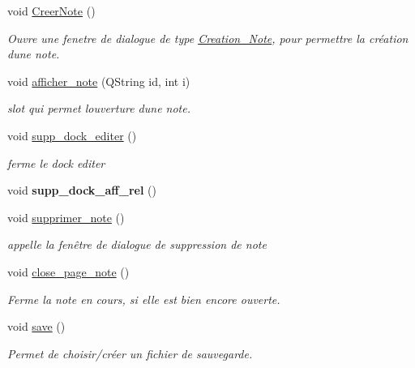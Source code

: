 \begin{DoxyCompactItemize}
void \hyperlink{classinterface_a23957135caad59d8850fe8e2cbee28a3}{Creer\+Note} ()
\begin{DoxyCompactList}\small\item\em Ouvre une fenetre de dialogue de type \hyperlink{class_creation___note}{Creation\+\_\+\+Note}, pour permettre la création d\textquotesingle{}une note. \end{DoxyCompactList}\item 
void \hyperlink{classinterface_a320051a7a36aa24f53b12df82649f15f}{afficher\+\_\+note} (Q\+String id, int i)
\begin{DoxyCompactList}\small\item\em slot qui permet l\textquotesingle{}ouverture d\textquotesingle{}une note. \end{DoxyCompactList}\item 
\mbox{\label{classinterface_a3144306293774f567cbe90fa90cfd796}} 
void \hyperlink{classinterface_a3144306293774f567cbe90fa90cfd796}{supp\+\_\+dock\+\_\+editer} ()
\begin{DoxyCompactList}\small\item\em ferme le dock editer \end{DoxyCompactList}\item 
\mbox{\label{classinterface_a1a6237ea46e9abd0662b8ec19c556f5e}} 
void {\bfseries supp\+\_\+dock\+\_\+aff\+\_\+rel} ()
\item 
void \hyperlink{classinterface_aca23c755ba40ca8198010ff0487b22a8}{supprimer\+\_\+note} ()
\begin{DoxyCompactList}\small\item\em appelle la fenêtre de dialogue de suppression de note \end{DoxyCompactList}\item 
void \hyperlink{classinterface_abe2464522932a5d8ed76d1ba02c9d2c6}{close\+\_\+page\+\_\+note} ()
\begin{DoxyCompactList}\small\item\em Ferme la note en cours, si elle est bien encore ouverte. \end{DoxyCompactList}\item 
void \hyperlink{classinterface_a319f133949e2be97a203f725c3f1e565}{save} ()
\begin{DoxyCompactList}\small\item\em Permet de choisir/créer un fichier de sauvegarde. \end{DoxyCompactList}\end{DoxyCompactItemize}
